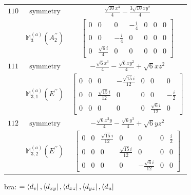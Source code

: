 \documentclass[fleqn,8pt,landscape]{jsarticle}
\begin{document}
\begin{longtable}{ccc}
$ 110 $ & $ \text{symmetry} $ & $ \frac{\sqrt{10} x^{3}}{4} - \frac{3 \sqrt{10} x y^{2}}{4} $ \\
$  $ & $ \mathbb{M}_{3}^{(a)}(A_{2}^{\prime\prime}) $ & $ \begin{bmatrix} 0 & 0 & 0 & - \frac{i}{4} & 0 & 0 & 0 \\ 0 & 0 & - \frac{i}{4} & 0 & 0 & 0 & 0 \\ 0 & \frac{\sqrt{6} i}{4} & 0 & 0 & 0 & 0 & 0 \end{bmatrix} $ \\ \hline
$ 111 $ & $ \text{symmetry} $ & $ - \frac{\sqrt{6} x^{3}}{4} - \frac{\sqrt{6} x y^{2}}{4} + \sqrt{6} x z^{2} $ \\
$  $ & $ \mathbb{M}_{3,1}^{(a)}(E^{\prime\prime}) $ & $ \begin{bmatrix} 0 & 0 & 0 & - \frac{\sqrt{15} i}{12} & 0 & 0 & 0 \\ 0 & 0 & \frac{\sqrt{15} i}{12} & 0 & 0 & 0 & - \frac{i}{2} \\ 0 & 0 & 0 & 0 & 0 & \frac{\sqrt{6} i}{12} & 0 \end{bmatrix} $ \\ \hline
$ 112 $ & $ \text{symmetry} $ & $ - \frac{\sqrt{6} x^{2} y}{4} - \frac{\sqrt{6} y^{3}}{4} + \sqrt{6} y z^{2} $ \\
$  $ & $ \mathbb{M}_{3,2}^{(a)}(E^{\prime\prime}) $ & $ \begin{bmatrix} 0 & 0 & \frac{\sqrt{15} i}{12} & 0 & 0 & 0 & \frac{i}{2} \\ 0 & 0 & 0 & \frac{\sqrt{15} i}{12} & 0 & 0 & 0 \\ 0 & 0 & 0 & 0 & - \frac{\sqrt{6} i}{12} & 0 & 0 \end{bmatrix} $ \\ \hline
\end{longtable}
bra: $=\bra{d_{v}}, \bra{d_{xy}}, \bra{d_{xz}}, \bra{d_{yz}}, \bra{d_{u}}$
\end{document}
